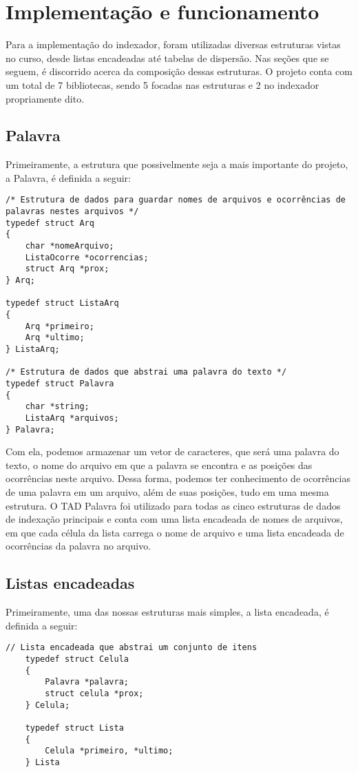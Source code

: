 \chapter{Implementação e funcionamento}\label{cap:implementacao-funcionamento}

Para a implementação do indexador, foram utilizadas diversas estruturas vistas no curso, desde listas encadeadas até tabelas de dispersão. Nas seções que se seguem, é discorrido acerca da composição dessas estruturas. O projeto conta com um total de 7 bibliotecas, sendo 5 focadas nas estruturas e 2 no indexador propriamente dito.

\section{Palavra}
Primeiramente, a estrutura que possivelmente seja a mais importante do projeto, a Palavra, é definida a seguir:
\begin{lstlisting}
/* Estrutura de dados para guardar nomes de arquivos e ocorrências de palavras nestes arquivos */
typedef struct Arq
{
    char *nomeArquivo;
    ListaOcorre *ocorrencias;
    struct Arq *prox;
} Arq;

typedef struct ListaArq
{
    Arq *primeiro;
    Arq *ultimo;
} ListaArq;

/* Estrutura de dados que abstrai uma palavra do texto */
typedef struct Palavra
{
    char *string;
    ListaArq *arquivos;
} Palavra;
\end{lstlisting}

Com ela, podemos armazenar um vetor de caracteres, que será uma palavra do texto, o nome do arquivo em que a palavra se encontra e as posições das ocorrências neste arquivo. Dessa forma, podemos ter conhecimento de ocorrências de uma palavra em um arquivo, além de suas posições, tudo em uma mesma estrutura. O TAD Palavra foi utilizado para todas as cinco estruturas de dados de indexação principais e conta com uma lista encadeada de nomes de arquivos, em que cada célula da lista carrega o nome de arquivo e uma lista encadeada de ocorrências da palavra no arquivo.

\section{Listas encadeadas}
Primeiramente, uma das nossas estruturas mais simples, a lista encadeada, é definida a seguir:
\begin{lstlisting}
// Lista encadeada que abstrai um conjunto de itens
    typedef struct Celula
    {
        Palavra *palavra;
        struct celula *prox;
    } Celula;

    typedef struct Lista
    {
        Celula *primeiro, *ultimo;
    } Lista
\end{lstlisting}

